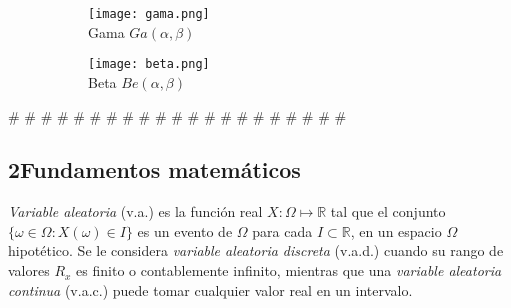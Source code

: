 \begin{figure}[H]
	\begin{subfigure}[t]{.475\textwidth}\texttt{[image: gama.png]}\centering\\Gama $Ga(\alpha,\beta)$
	\end{subfigure}\qquad
	\begin{subfigure}[t]{.475\textwidth}\texttt{[image: beta.png]}\centering\\Beta $Be(\alpha,\beta)$
	\end{subfigure}
\end{figure}





\# \# \# \# \# \# \# \# \# \# \# \# \# \# \# \# \# \# \# \# \# \




\subsection {2Fundamentos matemáticos}
\emph{Variable aleatoria} (v.a.) es la función real $X: \Omega\mapsto\mathbb{R}$ tal que el conjunto $\{\omega\in\Omega:X(\omega)\in I\}$ es un evento de $\Omega$ para cada $I\subset\mathbb{R}$, en un espacio $\Omega$ hipotético. Se le considera \emph{variable aleatoria discreta} (v.a.d.) cuando su rango de valores $R_x$ es finito o contablemente infinito, mientras que una \emph{variable aleatoria continua} (v.a.c.) puede tomar cualquier valor real en un intervalo.

